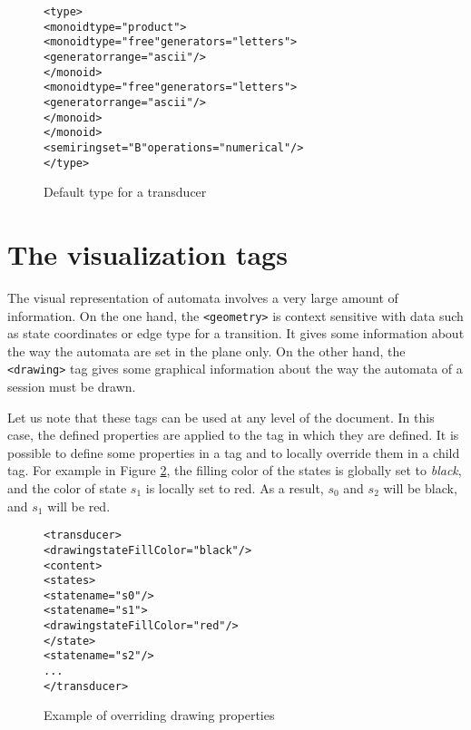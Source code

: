\documentclass[a4paper]{llncs}
\def\geometrytag{\texttt{<geometry>}}
\def\drawingtag{\texttt{<drawing>}}
\begin{document}
\begin{figure}[h]
  \begin{center}
\begin{alltt}
<type>
  <monoid type="product">
     <monoid type="free" generators="letters">
       <generator range="ascii"/>
     </monoid>
     <monoid type="free" generators="letters">
       <generator range="ascii"/>
     </monoid>
  </monoid>
  <semiring set="B" operations="numerical"/>
</type>
\end{alltt}

\caption{Default type for a transducer}
\label{transducertype}
  \end{center}
\end{figure}

\section{The visualization tags}
\label{title_vizualisation}
The visual representation of automata involves a very large amount of
information. On the one hand, the \geometrytag{} is context sensitive with
data such as state coordinates or edge type for a transition. It gives
some information about the way the automata are set in the plane only.
On the other hand, the \drawingtag{} tag gives some graphical information about
the way the automata of a session must be drawn.

Let us note that these tags can be used at any level of the document. In this
case, the defined properties are applied to the tag in which they are defined.
It is possible to define some properties in a tag and to locally override
them in a child tag. For example in Figure \ref{override_properties}, the
filling color of the states is globally set to \textit{black}, and the color of state
$s_1$ is locally set to red. As a result, $s_0$ and $s_2$ will be black, and $s_1$ will be red.

{\small
\begin{figure}[h]
  \begin{center}
\begin{alltt}
<transducer>
  <drawing stateFillColor="black"/>
  <content>
     <states>
        <state name="s0"/>
        <state name="s1">
            <drawing stateFillColor="red"/>
        </state>
        <state name="s2"/>
      ...
</transducer>
\end{alltt}

\caption{Example of overriding drawing properties}
\label{override_properties}
  \end{center}
\end{figure}
}
\end{document}
